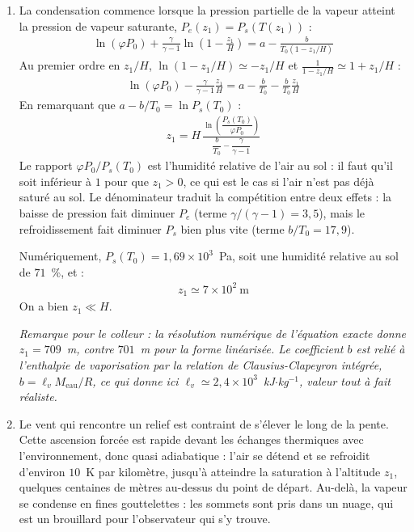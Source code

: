 \begin{correction}
\begin{enumerate}
\begin{enumerate}
	Tant qu'il n'y a pas de condensation, la composition de la masse d'air ne change pas et $\varphi$ reste constante. D'après la loi de Dalton :
	\begin{align*}
		\boxed{P_e(z)=\varphi P(z)=\varphi P_0\left(1-\frac{z}{H}\right)^{\frac{\gamma}{\gamma-1}}}
	\end{align*}

	\item La condensation commence lorsque la pression partielle de la vapeur atteint la pression de vapeur saturante, $P_e(z_1)=P_s\left(T(z_1)\right)$ :
	\begin{align*}
		\ln(\varphi P_0)+\frac{\gamma}{\gamma-1}\ln\left(1-\frac{z_1}{H}\right)=a-\frac{b}{T_0\left(1-z_1/H\right)}
	\end{align*}
	Au premier ordre en $z_1/H$, $\ln(1-z_1/H)\simeq-z_1/H$ et $\frac{1}{1-z_1/H}\simeq1+z_1/H$ :
	\begin{align*}
		\ln(\varphi P_0)-\frac{\gamma}{\gamma-1}\frac{z_1}{H}=a-\frac{b}{T_0}-\frac{b}{T_0}\frac{z_1}{H}
	\end{align*}
	En remarquant que $a-b/T_0=\ln P_s(T_0)$ :
	\begin{align*}
		\boxed{z_1=H\,\frac{\ln\left(\dfrac{P_s(T_0)}{\varphi P_0}\right)}{\dfrac{b}{T_0}-\dfrac{\gamma}{\gamma-1}}}
	\end{align*}
	Le rapport $\varphi P_0/P_s(T_0)$ est l'humidité relative de l'air au sol : il faut qu'il soit inférieur à $1$ pour que $z_1>0$, ce qui est le cas si l'air n'est pas déjà saturé au sol. Le dénominateur traduit la compétition entre deux effets : la baisse de pression fait diminuer $P_e$ (terme $\gamma/(\gamma-1)=3{,}5$), mais le refroidissement fait diminuer $P_s$ bien plus vite (terme $b/T_0=17{,}9$).

	Numériquement, $P_s(T_0)=1{,}69\times10^{3}$~Pa, soit une humidité relative au sol de $71$~\%, et :
	\begin{align*}
		z_1\simeq7\times10^{2}~\text{m}
	\end{align*}
	On a bien $z_1\ll H$.

	\textit{Remarque pour le colleur : la résolution numérique de l'équation exacte donne $z_1=709$~m, contre $701$~m pour la forme linéarisée. Le coefficient $b$ est relié à l'enthalpie de vaporisation par la relation de Clausius-Clapeyron intégrée, $b=\ell_vM_{\mathrm{eau}}/R$, ce qui donne ici $\ell_v\simeq2{,}4\times10^{3}$~kJ$\cdot$kg$^{-1}$, valeur tout à fait réaliste.}

	\item Le vent qui rencontre un relief est contraint de s'élever le long de la pente. Cette ascension forcée est rapide devant les échanges thermiques avec l'environnement, donc quasi adiabatique : l'air se détend et se refroidit d'environ $10$~K par kilomètre, jusqu'à atteindre la saturation à l'altitude $z_1$, quelques centaines de mètres au-dessus du point de départ. Au-delà, la vapeur se condense en fines gouttelettes : les sommets sont pris dans un nuage, qui est un brouillard pour l'observateur qui s'y trouve.


\end{enumerate}
\end{enumerate}
\end{correction}
